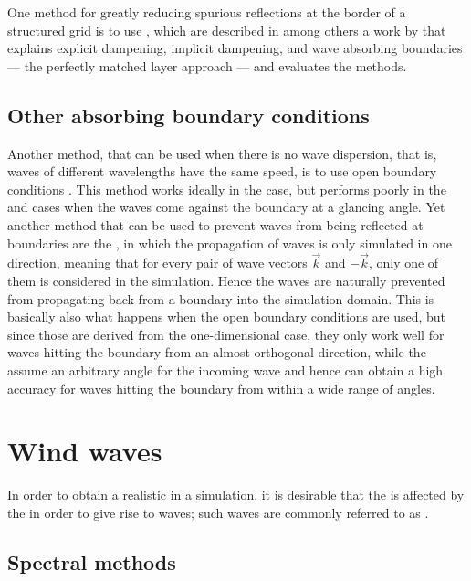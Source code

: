 One method for greatly reducing spurious reflections at the border of a structured grid is to use , which are described in among others a work by \citet{Soderstrom2010} that explains explicit dampening, implicit dampening, and wave absorbing boundaries --- the perfectly matched layer approach --- and evaluates the methods.

\subsection{Other absorbing boundary conditions}

Another method, that can be used when there is no wave dispersion, that is, waves of different wavelengths have the same speed, is to use open boundary conditions \citep{Muller-Fischer2008}. This method works ideally in the  case, but performs poorly in the  and  cases when the waves come against the boundary at a glancing angle. Yet another method that can be used to prevent waves from being reflected at boundaries are the \AWWE \citep{Guddati2005}, in which the propagation of waves is only simulated in one direction, meaning that for every pair of wave vectors $\vec{k}$ and $-\vec{k}$, only one of them is considered in the simulation. Hence the waves are naturally prevented from propagating back from a boundary into the simulation domain. This is basically also what happens when the open boundary conditions are used, but since those are derived from the one-dimensional case, they only work well for waves hitting the boundary from an almost orthogonal direction, while the \AWWE assume an arbitrary angle for the incoming wave and hence can obtain a high accuracy for waves hitting the boundary from within a wide range of angles.

\section{Wind waves}

In order to obtain a realistic  in a simulation, it is desirable that the  is affected by the \wind in order to give rise to waves; such waves are commonly referred to as .

\subsection{Spectral methods}

